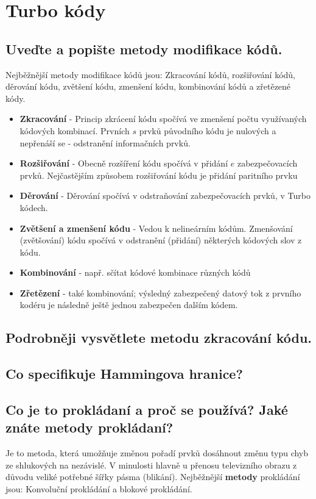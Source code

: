 \clearpage
\section{Turbo kódy}
\subsection{Uveďte a popište metody modifikace kódů.}
Nejběžnější metody modifikace kódů jsou: Zkracování kódů, rozšiřování kódů, děrování kódu, zvětšení kódu, zmenšení kódu, kombinování kódů a zřetězené kódy.
\begin{itemize}
    \item \textbf{Zkracování} - Princip zkrácení kódu spočívá ve zmenšení počtu využívaných kódových kombinací. Prvních $s$ prvků původního kódu je nulových a nepřenáší se - odstranění informačních prvků.
    \item \textbf{Rozšiřování} - Obecně rozšíření kódu spočívá v přidání $e$ zabezpečovacích prvků. Nejčastějším způsobem rozšiřování kódu je přidání paritního prvku
    \item \textbf{Děrování} - Děrování spočívá v odstraňování zabezpečovacích prvků, v Turbo kódech.
    \item \textbf{Zvětšení a zmenšení kódu} -  Vedou k nelineárním kódům. Zmenšování (zvětšování) kódu spočívá v odstranění (přidání) některých kódových slov z kódu.
    \item \textbf{Kombinování} - např. sčítat kódové kombinace různých kódů
    \item \textbf{Zřetězení} - také kombinování; výsledný zabezpečený datový tok z prvního kodéru je následně ještě jednou zabezpečen dalším kódem.
\end{itemize}

\subsection{Podrobněji vysvětlete metodu zkracování kódu.}

\subsection{Co specifikuje Hammingova hranice?}

\subsection{Co je to prokládaní a proč se používá? Jaké znáte metody prokládaní?}
Je to metoda, která umožňuje změnou pořadí prvků dosáhnout změnu typu chyb ze shlukových na nezávislé. V minulosti hlavně u přenosu televizního obrazu z důvodu veliké potřebné šířky pásma (blikání). Nejběžnější \textbf{metody} prokládání jsou: Konvoluční prokládání a blokové prokládání.

